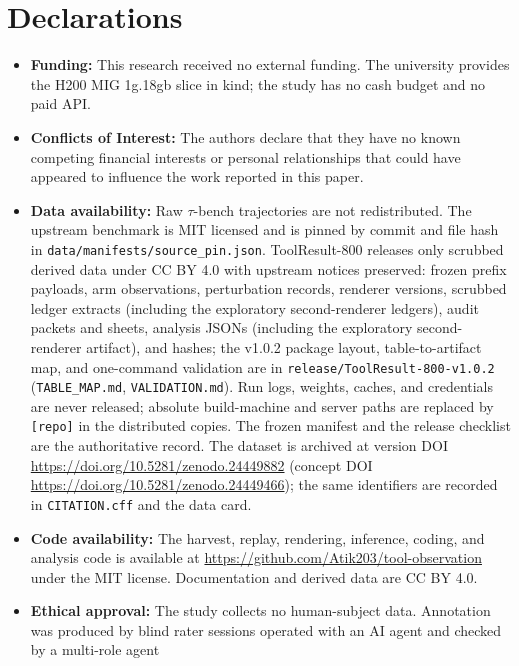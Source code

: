 \documentclass[a4paper,fleqn]{cas-sc}
\begin{document}
\renewcommand{\thetable}{\arabic{table}}

\section*{Declarations}
\begin{itemize}
  \setlength{\itemsep}{0pt}
  \setlength{\parsep}{0pt}
  \item \textbf{Funding:} This research received no external funding. The university provides the
  H200 MIG 1g.18gb slice in kind; the study has no cash budget and no paid API.
  \item \textbf{Conflicts of Interest:} The authors declare that they have no known competing
  financial interests or personal relationships that could have appeared to influence the work
  reported in this paper.
  \item \textbf{Data availability:} Raw $\tau$-bench trajectories are not redistributed. The
  upstream benchmark is MIT licensed and is pinned by commit and file hash in
  \texttt{data/manifests/source\_pin.json}. ToolResult-800 releases only scrubbed derived
  data under CC BY 4.0 with upstream notices preserved: frozen prefix payloads, arm observations,
  perturbation records, renderer versions, scrubbed ledger extracts (including the exploratory
  second-renderer ledgers), audit packets and sheets, analysis JSONs (including the exploratory
  second-renderer artifact), and hashes; the v1.0.2 package layout, table-to-artifact map, and
  one-command validation are in \texttt{release/ToolResult-800-v1.0.2} (\texttt{TABLE\_MAP.md},
  \texttt{VALIDATION.md}). Run logs, weights, caches, and credentials are never released;
  absolute build-machine and server paths are replaced by \texttt{[repo]} in the distributed
  copies. The frozen manifest and the release checklist are the authoritative record. The
  dataset is archived at version DOI
  \url{https://doi.org/10.5281/zenodo.24449882} (concept DOI
  \url{https://doi.org/10.5281/zenodo.24449466}); the same identifiers are recorded in
  \texttt{CITATION.cff} and the data card.
  \item \textbf{Code availability:} The harvest, replay, rendering, inference, coding, and
  analysis code is available at \url{https://github.com/Atik203/tool-observation} under the MIT
  license. Documentation and derived data are CC BY 4.0.
  \item \textbf{Ethical approval:} The study collects no human-subject data. Annotation was
  produced by blind rater sessions operated with an AI agent and checked by a multi-role agent

\end{itemize}
\end{document}
